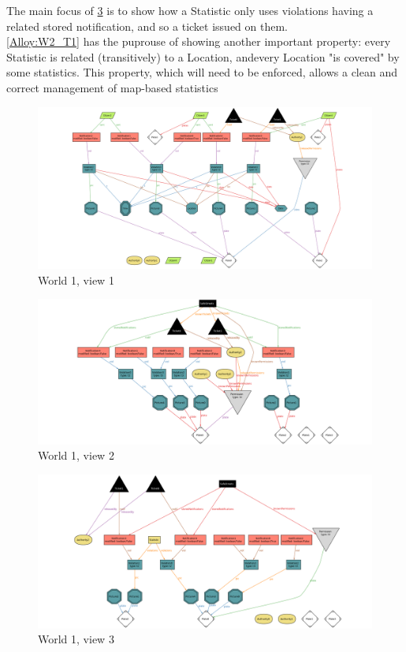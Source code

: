 \documentclass{article}
\begin{document}
	 The main focus of \ref{Alloy:W1_T3} is to show how a Statistic only uses violations having a
	 related stored notification, and so a ticket issued on them.\\
	 
	 \ref{Alloy:W2_T1} has the puprouse of showing another important property: every Statistic is 
	 related (transitively) to a Location, andevery Location "is covered" by some statistics. This
	 property, which will need to be enforced, allows a clean and correct management of map-based
	 statistics
	\begin{figure}[H]
		\includegraphics[width=\linewidth]{Images/Alloy_W1_T1}
		\caption{World 1, view 1}
		\label{Alloy:W1_T1}
	\end{figure}
	\begin{figure}[H]
		\includegraphics[width=\linewidth]{Images/Alloy_W1_T2}
		\caption{World 1, view 2}
		\label{Alloy:W1_T2}
	\end{figure}
	\begin{figure}[H]
		\includegraphics[width=\linewidth]{Images/Alloy_W1_T3}
		\caption{World 1, view 3}
		\label{Alloy:W1_T3}
	\end{figure}
\end{document}
